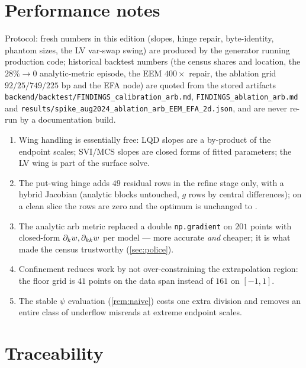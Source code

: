 \documentclass[11pt]{article}
\begin{document}
\section{Performance notes}
\label{app:perf}

Protocol: fresh numbers in this edition (slopes, hinge repair,
byte-identity, phantom sizes, the LV var-swap swing) are produced by the
generator running production code; historical backtest numbers (the
census shares and location, the $28\%\to0$ analytic-metric episode, the
EEM $400\times$ repair, the ablation grid $92/25/749/225$ bp and the
EFA node) are quoted from the stored artifacts
\texttt{backend/backtest/FINDINGS\_calibration\_arb.md},
\texttt{FINDINGS\_ablation\_arb.md} and
\texttt{results/spike\_aug2024\_ablation\_arb\_EEM\_EFA\_2d.json}, and
are never re-run by a documentation build.

\begin{enumerate}[leftmargin=1.6em]
\item Wing handling is essentially free: LQD slopes are a by-product of
the endpoint scales; SVI/MCS slopes are closed forms of fitted
parameters; the LV wing is part of the surface solve.
\item The put-wing hinge adds $49$ residual rows in the refine stage
only, with a hybrid Jacobian (analytic blocks untouched, $g$ rows by
central differences); on a clean slice the rows are zero and the
optimum is unchanged to \wlqbyteid.
\item The analytic arb metric replaced a double \texttt{np.gradient} on
$201$ points with closed-form $\partial_kw,\partial_{kk}w$ per
model --- more accurate \emph{and} cheaper; it is what made the census
trustworthy (\cref{sec:police}).
\item Confinement reduces work by not over-constraining the
extrapolation region: the floor grid is $41$ points on the data span
instead of $161$ on $[-1,1]$.
\item The stable $\psi$ evaluation (\cref{rem:naive}) costs one extra
division and removes an entire class of underflow misreads at extreme
endpoint scales.
\end{enumerate}

\section{Traceability}
\label{app:trace}
\end{document}
